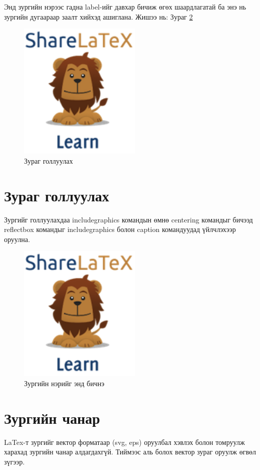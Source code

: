 \documentclass[12pt,A4]{report}
\begin{document}
Энд зургийн нэрээс гадна label-ийг давхар бичиж өгөх шаардлагатай ба энэ нь зургийн дугаараар заалт хийхэд ашиглана. Жишээ нь: Зураг \ref{fig:lion2}

\begin{figure}[h]
	\centering
	\includegraphics[scale=0.9]{figure01}
	\caption{Зураг голлуулах}
	\label{fig:lion1}
\end{figure}

\section{Зураг голлуулах}
Зургийг голлуулахдаа includegraphics командын өмнө centering
командыг бичээд reflectbox командыг includegraphics болон caption
командуудад үйлчлэхээр оруулна.

\begin{figure}[h]
	\includegraphics[scale=0.5]{figure01.png}
	\caption{Зургийн нэрийг энд бичнэ}

	\label{fig:lion2}
\end{figure}

\section{Зургийн чанар}
LaTex-т зургийг вектор форматаар (svg, eps) оруулбал хэвлэх болон томруулж харахад зургийн чанар
алдагдахгүй. Тиймээс аль болох вектор зураг оруулж өгвөл зүгээр.
\end{document}
